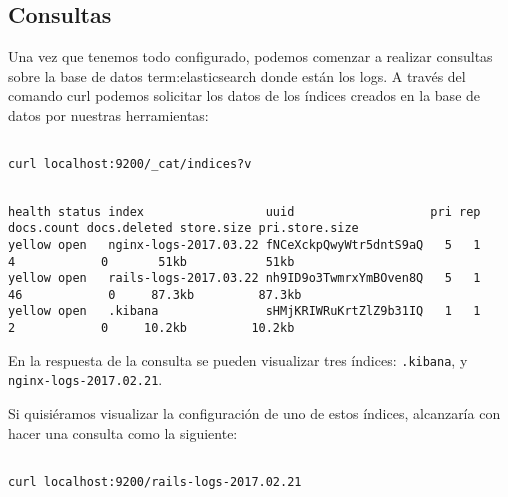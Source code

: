 \subsection{Consultas}
\label{consultas}

Una vez que tenemos todo configurado, podemos comenzar a realizar consultas
sobre la base de datos \gls{term:elasticsearch} donde están los logs. A través
del comando curl podemos solicitar los datos de los índices creados en la base
de datos por nuestras herramientas:

\begin{lstlisting}

curl localhost:9200/_cat/indices?v

\end{lstlisting}

\begin{lstlisting}

health status index                 uuid                   pri rep docs.count docs.deleted store.size pri.store.size
yellow open   nginx-logs-2017.03.22 fNCeXckpQwyWtr5dntS9aQ   5   1          4            0       51kb           51kb
yellow open   rails-logs-2017.03.22 nh9ID9o3TwmrxYmBOven8Q   5   1         46            0     87.3kb         87.3kb
yellow open   .kibana               sHMjKRIWRuKrtZlZ9b31IQ   1   1          2            0     10.2kb         10.2kb

\end{lstlisting}

En la respuesta de la consulta se pueden visualizar tres índices:
\texttt{.kibana},  y
\texttt{nginx-logs-2017.02.21}.

Si quisiéramos visualizar la configuración de uno de estos índices, alcanzaría
con hacer una consulta como la siguiente:

\begin{lstlisting}

curl localhost:9200/rails-logs-2017.02.21

\end{lstlisting}

